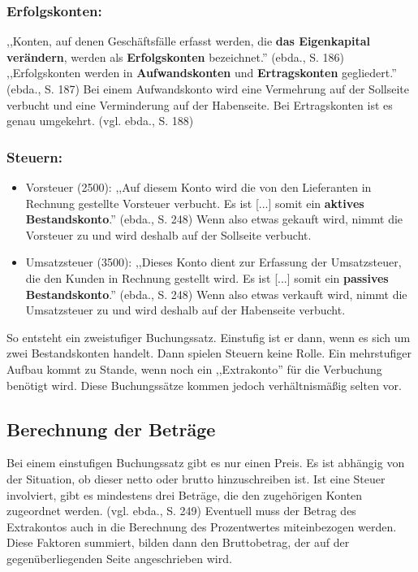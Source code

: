 \documentclass[12pt]{report}
\begin{document}
\subsubsection{Erfolgskonten:}
,,Konten, auf denen Geschäftsfälle erfasst werden, die \textbf{das Eigenkapital verändern}, werden als \textbf{Erfolgskonten} bezeichnet.'' (ebda., S. 186\nocite{RW1})
,,Erfolgskonten werden in \textbf{Aufwandskonten} und \textbf{Ertragskonten} gegliedert.'' (ebda., S. 187\nocite{RW1})
Bei einem Aufwandskonto wird eine Vermehrung auf der Sollseite verbucht und eine Verminderung auf der Habenseite. Bei Ertragskonten ist es genau umgekehrt. (vgl. ebda., S. 188\nocite{RW1})

\subsubsection{Steuern:}
\begin{itemize}
	\item Vorsteuer (2500):
	      ,,Auf diesem Konto wird die von den Lieferanten in Rechnung gestellte Vorsteuer verbucht.
	      Es ist [...] somit ein \textbf{aktives Bestandskonto}.'' (ebda., S. 248\nocite{RW1}) Wenn also etwas gekauft wird, nimmt die Vorsteuer zu und wird deshalb auf der Sollseite verbucht.
	\item Umsatzsteuer (3500):
	      ,,Dieses Konto dient zur Erfassung der Umsatzsteuer, die den Kunden in Rechnung gestellt wird.
	      Es ist [...] somit ein \textbf{passives Bestandskonto}.'' (ebda., S. 248\nocite{RW1}) Wenn also etwas verkauft wird, nimmt die Umsatzsteuer zu und wird deshalb auf der Habenseite verbucht.
\end{itemize}



\noindent So entsteht ein zweistufiger Buchungssatz. Einstufig ist er dann, wenn es sich um zwei Bestandskonten handelt. Dann spielen Steuern keine Rolle. Ein mehrstufiger Aufbau kommt zu Stande, wenn noch ein ,,Extrakonto'' für die Verbuchung benötigt wird. Diese Buchungssätze kommen jedoch verhältnismäßig selten vor.

\subsection{Berechnung der Beträge}
Bei einem einstufigen Buchungssatz gibt es nur einen Preis. Es ist abhängig von der Situation, ob dieser netto oder brutto hinzuschreiben ist. Ist eine Steuer involviert, gibt es mindestens drei Beträge, die den zugehörigen Konten zugeordnet werden. (vgl. ebda., S. 249\nocite{RW1}) Eventuell muss der Betrag des Extrakontos auch in die Berechnung des Prozentwertes miteinbezogen werden. Diese Faktoren summiert, bilden dann den Bruttobetrag, der auf der gegenüberliegenden Seite angeschrieben wird.
 
\end{document}
